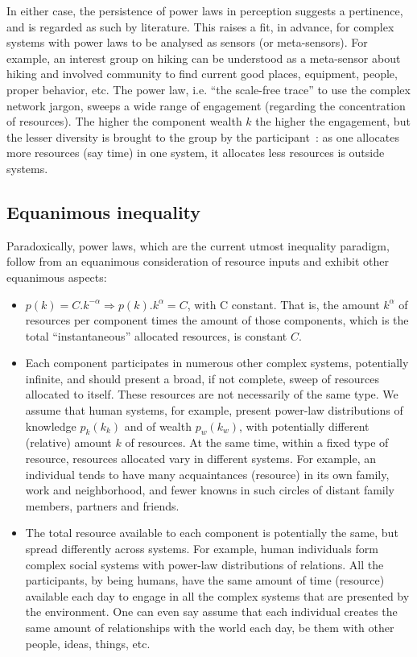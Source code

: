 \documentclass[a4paper, 11pt]{article} %
\begin{document}
In either case, the persistence of power laws in perception
suggests a pertinence, and is regarded as such by literature.
This raises
a fit, in advance, for complex systems with power laws
to be analysed as sensors (or meta-sensors).
For example, an interest group on hiking can be understood as
a meta-sensor about hiking and involved community to find current good
places, equipment, people, proper behavior, etc.
The power law, i.e. ``the scale-free trace'' to use
the complex network jargon, sweeps a wide
range of engagement (regarding the concentration of resources).
The higher the component wealth $k$ the higher the engagement,
but the lesser diversity is brought to the group
by the participant~\cite{tStable}: 
as one allocates more resources (say time)
in one system,
it allocates less resources is outside systems.

\subsection{Equanimous inequality}
Paradoxically, power laws, which are the 
current utmost inequality paradigm,
follow from an equanimous consideration
of resource inputs
and exhibit other equanimous aspects:
\begin{itemize}
	\item $p(k)=C.k^{-\alpha} \Rightarrow p(k).k^{\alpha}=C$, with C constant. That is, the amount $k^\alpha$ of resources per component times the amount of those components, which is the total ``instantaneous'' allocated resources, is constant $C$.
	\item Each component participates in numerous other complex systems, potentially infinite, and should present a broad, if not complete, sweep of resources allocated to itself.
		These resources are not necessarily of the same type. We assume that human systems, for example, present power-law distributions of knowledge $p_k(k_k)$ and of wealth $p_w(k_w)$, with potentially different (relative) amount $k$ of resources. At the same time, within a fixed type of resource, resources allocated vary in  different systems. For example, an individual tends to have many acquaintances (resource) in its own family, work and neighborhood, and fewer knowns in such circles of distant family members, partners and friends.
	\item The total resource available to each component is potentially the same, but spread differently across systems. For example, human individuals form complex social systems with power-law distributions of relations. All the participants, by being humans, have the same amount of time (resource) available each day to engage in all the complex systems that are presented by the environment. One can even say assume that each individual creates the same amount of relationships with the world each day, be them with other people, ideas, things, etc. 
\end{itemize}
\end{document}
